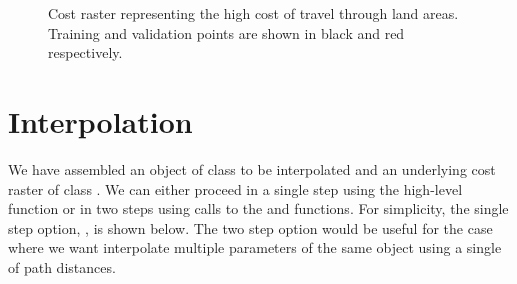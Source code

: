 \documentclass[nojss,shortnames]{jss}
\begin{document}
\begin{figure}[h!]
\begin{center}
\end{center}
\caption{Cost raster representing the high cost of travel through land areas. Training and validation points are shown in black and red respectively.}
\label{fig:zero}
\end{figure}
\FloatBarrier

\section{Interpolation}
We have assembled an object of class  to be interpolated and an underlying cost raster of class . We can either proceed in a single step using the high-level  function  or in two steps using calls to the  and  functions. For simplicity, the single step option, , is shown below. The two step option would be useful for the case where we want interpolate multiple parameters of the same  object using a single  of path distances.
\end{document}

